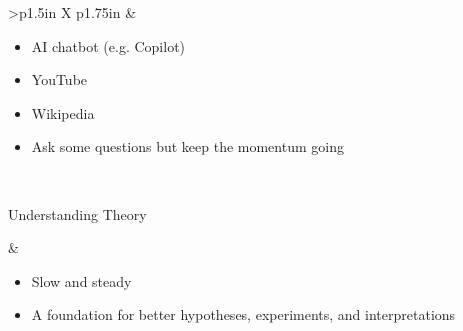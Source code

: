 \documentclass[8pt]{extarticle}
\begin{document}
\begin{tabularx}{\linewidth}{>{\bfseries}p{1.5in} X p{1.75in}}
                    &   \begin{minipage}[t]{\linewidth}
                            \vspace{0pt}

                            \begin{sourcesBox}
                            \begin{itemize}[nosep,leftmargin=*]
                                \item AI chatbot (e.g. Copilot)
                                \item YouTube
                                \item Wikipedia
                            \end{itemize}
                            \end{sourcesBox}

                            \begin{tipsBox}
                            \begin{itemize}[nosep,leftmargin=*]
                                \item Ask some questions but keep the momentum going
                            \end{itemize}
                            \end{tipsBox}
                        \end{minipage}

                            \\

    \addlinespace %

    \begin{minipage}[t]{\linewidth}
        \vspace{0pt}
        Understanding Theory
    \end{minipage}

            &   \begin{minipage}[t]{\linewidth}
                    \vspace{0pt}

                    \begin{whatBox}
                    \begin{itemize}[nosep,leftmargin=*]
                        \item Slow and steady
                        \item A foundation for better hypotheses, experiments, and interpretations
                    \end{itemize}
                    \end{whatBox}


\end{minipage}
\end{tabularx}
\end{document}
